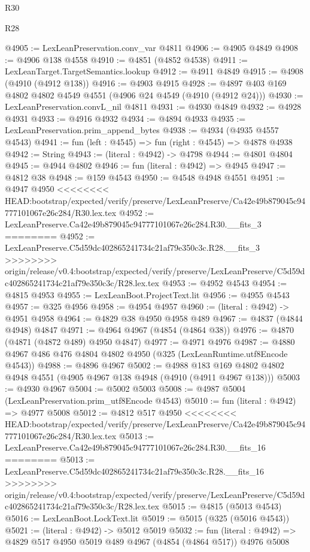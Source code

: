 \begin{lexlean}{R30}
\begin{lexlean}{R28}
\begin{coremodule}
{{{{{{{{{{{{{{{{{{{{{{{{{{{{{{{{{{{{{{{{{{{{{{{{{{{{{{{{{{{{{{{{{{{{{{{{{{{{{{{{{{{{{{{{{{{{{{{{{{{{{{{{{{{{{{{{{{{{{{{{{{{{{{{{{{{{{{{{{{{{{{{@4905 := LexLeanPreservation.conv_var @4811
@4906 := @4905 @4849
@4908 := @4906 @138 @4558
@4910 := @4851 (@4852 @4538)
@4911 := LexLeanTarget.TargetSemantics.lookup
@4912 := @4911 @4849
@4915 := @4908 (@4910 (@4912 @138))
@4916 := @4903 @4915
@4928 := @4897 @403 @169 @4802 @4802 @4549 @4551 (@4906 @24 @4549 (@4910 (@4912 @24)))
@4930 := LexLeanPreservation.convL_nil @4811
@4931 := @4930 @4849
@4932 := @4928 @4931
@4933 := @4916 @4932
@4934 := @4894 @4933
@4935 := LexLeanPreservation.prim_append_bytes
@4938 := @4934 (@4935 @4557 @4543)
@4941 := fun (left : @4545) => fun (right : @4545) => @4878 @4938
@4942 := String
@4943 := (literal : @4942) -> @4798
@4944 := @4801 @4804
@4945 := @4944 @4802
@4946 := fun (literal : @4942) => @4945
@4947 := @4812 @38
@4948 := @159 @4543
@4950 := @4548 @4948 @4551
@4951 := @4947 @4950
<<<<<<<< HEAD:bootstrap/expected/verify/preserve/LexLeanPreserve/Ca42e49b879045c94777101067e26c284/R30.lex.tex
@4952 := LexLeanPreserve.Ca42e49b879045c94777101067e26c284.R30.__fits_3
========
@4952 := LexLeanPreserve.C5d59dc402865241734c21af79e350c3c.R28.__fits_3
>>>>>>>> origin/release/v0.4:bootstrap/expected/verify/preserve/LexLeanPreserve/C5d59dc402865241734c21af79e350c3c/R28.lex.tex
@4953 := @4952 @4543
@4954 := @4815 @4953
@4955 := LexLeanBoot.ProjectText.lit
@4956 := @4955 @4543
@4957 := @325 @4956
@4958 := @4954 @4957
@4960 := (literal : @4942) -> @4951 @4958
@4964 := @4829 @38 @4950 @4958 @489
@4967 := @4837 (@4844 @4948) @4847
@4971 := @4964 @4967 (@4854 (@4864 @38))
@4976 := @4870 (@4871 (@4872 @489) @4950 @4847)
@4977 := @4971 @4976
@4987 := @4880 @4967 @486 @476 @4804 @4802 @4950 (@325 (LexLeanRuntime.utf8Encode @4543))
@4988 := @4896 @4967
@5002 := @4988 @183 @169 @4802 @4802 @4948 @4551 (@4905 @4967 @138 @4948 (@4910 (@4911 @4967 @138)))
@5003 := @4930 @4967
@5004 := @5002 @5003
@5008 := @4987 @5004 (LexLeanPreservation.prim_utf8Encode @4543)
@5010 := fun (literal : @4942) => @4977 @5008
@5012 := @4812 @517 @4950
<<<<<<<< HEAD:bootstrap/expected/verify/preserve/LexLeanPreserve/Ca42e49b879045c94777101067e26c284/R30.lex.tex
@5013 := LexLeanPreserve.Ca42e49b879045c94777101067e26c284.R30.__fits_16
========
@5013 := LexLeanPreserve.C5d59dc402865241734c21af79e350c3c.R28.__fits_16
>>>>>>>> origin/release/v0.4:bootstrap/expected/verify/preserve/LexLeanPreserve/C5d59dc402865241734c21af79e350c3c/R28.lex.tex
@5015 := @4815 (@5013 @4543)
@5016 := LexLeanBoot.LockText.lit
@5019 := @5015 (@325 (@5016 @4543))
@5021 := (literal : @4942) -> @5012 @5019
@5032 := fun (literal : @4942) => @4829 @517 @4950 @5019 @489 @4967 (@4854 (@4864 @517)) @4976 @5008
}}}}}}}}}}}}}}}}}}}}}}}}}}}}}}}}}}}}}}}}}}}}}}}}}}}}}}}}}}}}}}}}}}}}}}}}}}}}}}}}}}}}}}}}}}}}}}}}}}}}}}}}}}}}}}}}}}}}}}}}}}}}}}}}}}}}}}}}}}}}}}}
\end{coremodule}
\end{lexlean}
\end{lexlean}
